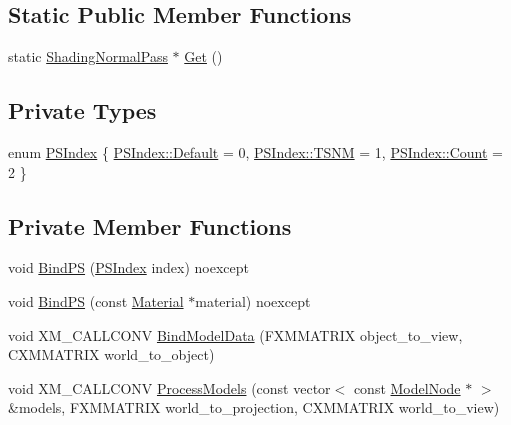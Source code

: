 \subsection*{Static Public Member Functions}
\begin{DoxyCompactItemize}
\item 
static \hyperlink{classmage_1_1_shading_normal_pass}{Shading\+Normal\+Pass} $\ast$ \hyperlink{classmage_1_1_shading_normal_pass_a27351f21b0e5d780b9c68e01f1428ace}{Get} ()
\end{DoxyCompactItemize}
\subsection*{Private Types}
\begin{DoxyCompactItemize}
\item 
enum \hyperlink{classmage_1_1_shading_normal_pass_a6d277753d26a7854c448b3e0d9275b19}{P\+S\+Index} \{ \hyperlink{classmage_1_1_shading_normal_pass_a6d277753d26a7854c448b3e0d9275b19a7a1920d61156abc05a60135aefe8bc67}{P\+S\+Index\+::\+Default} = 0, 
\hyperlink{classmage_1_1_shading_normal_pass_a6d277753d26a7854c448b3e0d9275b19a6e02c9f63944ea221e7d55c11ecae07b}{P\+S\+Index\+::\+T\+S\+NM} = 1, 
\hyperlink{classmage_1_1_shading_normal_pass_a6d277753d26a7854c448b3e0d9275b19ae93f994f01c537c4e2f7d8528c3eb5e9}{P\+S\+Index\+::\+Count} = 2
 \}
\end{DoxyCompactItemize}
\subsection*{Private Member Functions}
\begin{DoxyCompactItemize}
\item 
void \hyperlink{classmage_1_1_shading_normal_pass_ab691c2125f9e21c7e70f2737037504bc}{Bind\+PS} (\hyperlink{classmage_1_1_shading_normal_pass_a6d277753d26a7854c448b3e0d9275b19}{P\+S\+Index} index) noexcept
\item 
void \hyperlink{classmage_1_1_shading_normal_pass_af8ef8987bda86646712780b5cfad0b72}{Bind\+PS} (const \hyperlink{classmage_1_1_material}{Material} $\ast$material) noexcept
\item 
void X\+M\+\_\+\+C\+A\+L\+L\+C\+O\+NV \hyperlink{classmage_1_1_shading_normal_pass_adbaa57a7ff6bc885bf2ab890b0f933d4}{Bind\+Model\+Data} (F\+X\+M\+M\+A\+T\+R\+IX object\+\_\+to\+\_\+view, C\+X\+M\+M\+A\+T\+R\+IX world\+\_\+to\+\_\+object)
\item 
void X\+M\+\_\+\+C\+A\+L\+L\+C\+O\+NV \hyperlink{classmage_1_1_shading_normal_pass_a383e9cab46d4d9bdfcf320c68a210d0d}{Process\+Models} (const vector$<$ const \hyperlink{classmage_1_1_model_node}{Model\+Node} $\ast$ $>$ \&models, F\+X\+M\+M\+A\+T\+R\+IX world\+\_\+to\+\_\+projection, C\+X\+M\+M\+A\+T\+R\+IX world\+\_\+to\+\_\+view)
\end{DoxyCompactItemize}
